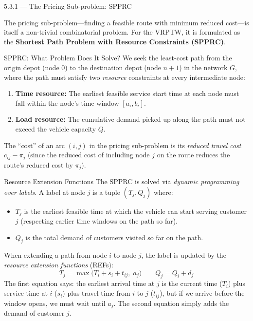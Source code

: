\documentclass[aspectratio=169,10pt]{beamer}
\begin{document}
\begin{frame}[allowframebreaks]{5.3.1 --- The Pricing Sub-problem: SPPRC}

The pricing sub-problem---finding a feasible route with minimum reduced cost---is
itself a non-trivial combinatorial problem.  For the VRPTW, it is formulated as the
\textbf{Shortest Path Problem with Resource Constraints (SPPRC)}.

\begin{block}{SPPRC: What Problem Does It Solve?}
We seek the least-cost path from the origin depot (node 0) to the destination
depot (node $n+1$) in the network $G$, where the path must satisfy two
\emph{resource} constraints at every intermediate node:
\begin{enumerate}
  \item \textbf{Time resource:} The earliest feasible service start time at each
    node must fall within the node's time window $[a_i, b_i]$.
  \item \textbf{Load resource:} The cumulative demand picked up along the path
    must not exceed the vehicle capacity $Q$.
\end{enumerate}
The ``cost'' of an arc $(i,j)$ in the pricing sub-problem is its \emph{reduced
travel cost} $c_{ij} - \pi_j$ (since the reduced cost of including node $j$ on
the route reduces the route's reduced cost by $\pi_j$).
\end{block}

\framebreak

\begin{block}{Resource Extension Functions}
The SPPRC is solved via \emph{dynamic programming over labels}.  A label at node
$j$ is a tuple $(T_j, Q_j)$ where:
\begin{itemize}
  \item $T_j$ is the earliest feasible time at which the vehicle can start serving
    customer $j$ (respecting earlier time windows on the path so far).
  \item $Q_j$ is the total demand of customers visited so far on the path.
\end{itemize}
When extending a path from node $i$ to node $j$, the label is updated by the
\emph{resource extension functions} (REFs):
\[
  T_j = \max\bigl(T_i + s_i + t_{ij},\; a_j\bigr)
  \qquad
  Q_j = Q_i + d_j
\]
The first equation says: the earliest arrival time at $j$ is the current time
($T_i$) plus service time at $i$ ($s_i$) plus travel time from $i$ to $j$
($t_{ij}$), but if we arrive before the window opens, we must wait until $a_j$.
The second equation simply adds the demand of customer $j$.


\end{block}
\end{frame}
\end{document}
